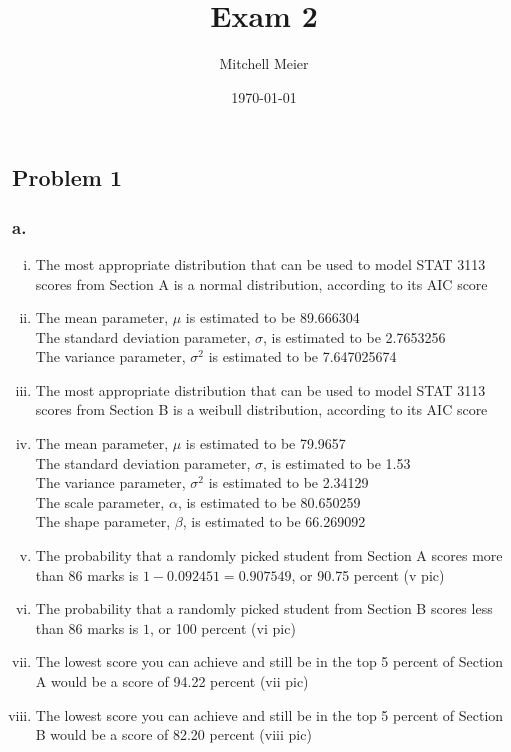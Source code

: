 \documentclass[14pt]{article}
\title{Exam 2}
\author{Mitchell Meier}
\date{\today}
\begin{document}
\maketitle

\subsection*{Problem 1}

\subsubsection*{a.}
\begin{enumerate}[(i)]

\item
The most appropriate distribution that can be used to model STAT 3113 scores from Section A is a normal distribution, according to its AIC score

\item
The mean parameter, $\mu$ is estimated to be 89.666304 \\
The standard deviation parameter, $\sigma$, is estimated to be 2.7653256 \\
The variance parameter, $\sigma^2$ is estimated to be 7.647025674 \\

\item
The most appropriate distribution that can be used to model STAT 3113 scores from Section B is a weibull distribution, according to its AIC score

\item
The mean parameter, $\mu$ is estimated to be 79.9657 \\
The standard deviation parameter, $\sigma$, is estimated to be 1.53 \\
The variance parameter, $\sigma^2$ is estimated to be 2.34129 \\
The scale parameter, $\alpha$, is estimated to be 80.650259 \\
The shape parameter, $\beta$, is estimated to be 66.269092 

\item
The probability that a randomly picked student from Section A scores more than 86 marks is $1 - 0.092451 = 0.907549$, or 90.75 percent (v pic)

\item
The probability that a randomly picked student from Section B scores less than 86 marks is $1$, or 100 percent (vi pic)

\item
The lowest score you can achieve and still be in the top 5 percent of Section A would be a score of 94.22 percent (vii pic)

\item
The lowest score you can achieve and still be in the top 5 percent of Section B would be a score of 82.20 percent (viii pic)

\end{enumerate}
\end{document}
